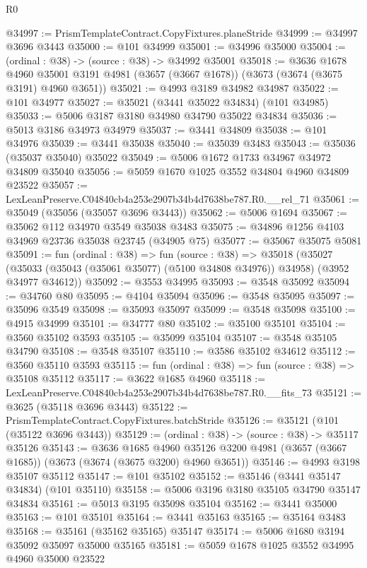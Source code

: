 \begin{lexlean}{R0}
\begin{coremodule}
@34997 := PrismTemplateContract.CopyFixtures.planeStride
@34999 := @34997 @3696 @3443
@35000 := @101 @34999
@35001 := @34996 @35000
@35004 := (ordinal : @38) -> (source : @38) -> @34992 @35001
@35018 := @3636
    @1678
    @4960
    @35001
    @3191
    @4981
    (@3657 (@3667 @1678))
    (@3673 (@3674 (@3675 @3191) @4960 @3651))
@35021 := @4993 @3189 @34982 @34987
@35022 := @101 @34977
@35027 := @35021 (@3441 @35022 @34834) (@101 @34985)
@35033 := @5006 @3187 @3180 @34980 @34790 @35022 @34834
@35036 := @5013 @3186 @34973 @34979
@35037 := @3441 @34809
@35038 := @101 @34976
@35039 := @3441 @35038
@35040 := @35039 @3483
@35043 := @35036 (@35037 @35040) @35022
@35049 := @5006 @1672 @1733 @34967 @34972 @34809 @35040
@35056 := @5059 @1670 @1025 @3552 @34804 @4960 @34809 @23522
@35057 := LexLeanPreserve.C04840cb4a253e2907b34b4d7638be787.R0.__rel_71
@35061 := @35049 (@35056 (@35057 @3696 @3443))
@35062 := @5006 @1694
@35067 := @35062 @112 @34970 @3549 @35038 @3483
@35075 := @34896 @1256 @4103 @34969 @23736 @35038 @23745 (@34905 @75)
@35077 := @35067 @35075 @5081
@35091 := fun (ordinal : @38) =>
  fun (source : @38) =>
  @35018
    (@35027 (@35033 (@35043 (@35061 @35077) (@5100 @34808 @34976)) @34958) (@3952 @34977 @34612))
@35092 := @3553 @34995
@35093 := @3548 @35092
@35094 := @34760 @80
@35095 := @4104 @35094
@35096 := @3548 @35095
@35097 := @35096 @3549
@35098 := @35093 @35097
@35099 := @3548 @35098
@35100 := @4915 @34999
@35101 := @34777 @80
@35102 := @35100 @35101
@35104 := @3560 @35102 @3593
@35105 := @35099 @35104
@35107 := @3548 @35105 @34790
@35108 := @3548 @35107
@35110 := @3586 @35102 @34612
@35112 := @3560 @35110 @3593
@35115 := fun (ordinal : @38) => fun (source : @38) => @35108 @35112
@35117 := @3622 @1685 @4960
@35118 := LexLeanPreserve.C04840cb4a253e2907b34b4d7638be787.R0.__fits_73
@35121 := @3625 (@35118 @3696 @3443)
@35122 := PrismTemplateContract.CopyFixtures.batchStride
@35126 := @35121 (@101 (@35122 @3696 @3443))
@35129 := (ordinal : @38) -> (source : @38) -> @35117 @35126
@35143 := @3636
    @1685
    @4960
    @35126
    @3200
    @4981
    (@3657 (@3667 @1685))
    (@3673 (@3674 (@3675 @3200) @4960 @3651))
@35146 := @4993 @3198 @35107 @35112
@35147 := @101 @35102
@35152 := @35146 (@3441 @35147 @34834) (@101 @35110)
@35158 := @5006 @3196 @3180 @35105 @34790 @35147 @34834
@35161 := @5013 @3195 @35098 @35104
@35162 := @3441 @35000
@35163 := @101 @35101
@35164 := @3441 @35163
@35165 := @35164 @3483
@35168 := @35161 (@35162 @35165) @35147
@35174 := @5006 @1680 @3194 @35092 @35097 @35000 @35165
@35181 := @5059 @1678 @1025 @3552 @34995 @4960 @35000 @23522

\end{coremodule}
\end{lexlean}
